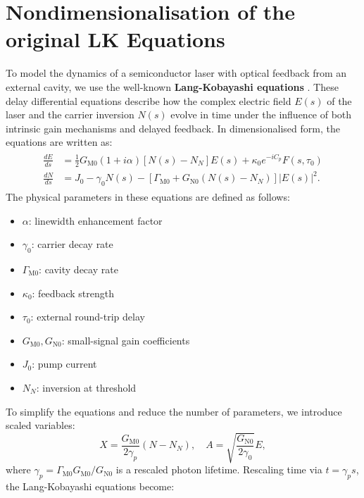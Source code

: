 \section{Nondimensionalisation of the original LK Equations}
\label{sec:LK_nondim}
%
\let\cleardoublepage\origcleardoublepage
%
To model the dynamics of a semiconductor laser with optical feedback from an external cavity, we use the well-known \textbf{Lang-Kobayashi equations} \cite{lang1980external}. These delay differential equations describe how the complex electric field \( E(s) \) of the laser and the carrier inversion \( N(s) \) evolve in time under the influence of both intrinsic gain mechanisms and delayed feedback. In dimensionalised form, the equations are written as:
%
\label{eq:dimensionalised_LK}
\begin{gather}
\begin{aligned}
\frac{d E}{d s} &= \frac{1}{2} G_{\mathrm{M}0}(1 + i \alpha) \left[N(s) - N_N\right] E(s) + \kappa_0 e^{-i C_p} F(s, \tau_0)\\
\frac{d N}{d s} &= J_0 - \gamma_0 N(s) - \left[\Gamma_{\mathrm{M}0} + G_{\mathrm{N}0}(N(s) - N_N)\right] |E(s)|^2.
\end{aligned}
\end{gather}
%
The physical parameters in these equations are defined as follows:
\begin{itemize}
  \item \( \alpha \): linewidth enhancement factor
  \item \( \gamma_0 \): carrier decay rate
  \item \( \Gamma_{\mathrm{M}0} \): cavity decay rate
  \item \( \kappa_0 \): feedback strength
  \item \( \tau_0 \): external round-trip delay
  \item \( G_{\mathrm{M}0}, G_{\mathrm{N}0} \): small-signal gain coefficients
  \item \( J_0 \): pump current
  \item \( N_N \): inversion at threshold
\end{itemize}
%
\par
%
To simplify the equations and reduce the number of parameters, we introduce scaled variables:
%
\[
X = \frac{G_{\mathrm{M}0}}{2 \gamma_p}(N - N_N), \quad A = \sqrt{\frac{G_{\mathrm{N}0}}{2 \gamma_0}} E,
\]
where \( \gamma_p = \Gamma_{\mathrm{M}0} G_{\mathrm{M}0} / G_{\mathrm{N}0} \) is a rescaled photon lifetime. Rescaling time via \( t = \gamma_p s \), the Lang-Kobayashi equations become:
